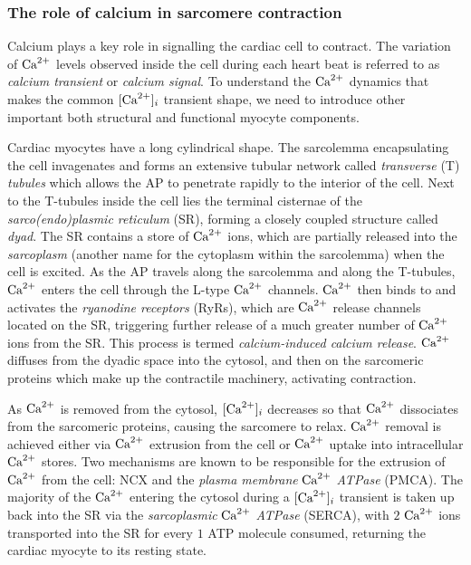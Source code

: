

%
%
%
\subsubsection{The role of calcium in sarcomere contraction}\label{ch1:the_role_of_calcium_in_sarcomere_contraction}
Calcium plays a key role in signalling the cardiac cell to contract. The variation of $\textrm{Ca}^{2+}$ levels observed inside the cell during each heart beat is referred to as \textit{calcium transient} or \textit{calcium signal}. To understand the $\textrm{Ca}^{2+}$ dynamics that makes the common $[\textrm{Ca}^{2+}]_{i}$ transient shape, we need to introduce other important both structural and functional myocyte components.

\vspace{0.2cm}
Cardiac myocytes have a long cylindrical shape. The sarcolemma encapsulating the cell invagenates and forms an extensive tubular network called \textit{transverse} (\acs{T}) \textit{tubules} which allows the AP to penetrate rapidly to the interior of the cell. Next to the T-tubules inside the cell lies the terminal cisternae of the \textit{sarco(endo)plasmic reticulum} (\acs{SR}), forming a closely coupled structure called \textit{dyad}. The SR contains a store of $\textrm{Ca}^{2+}$ ions, which are partially released into the \textit{sarcoplasm} (another name for the cytoplasm within the sarcolemma) when the cell is excited. As the AP travels along the sarcolemma and along the T-tubules, $\textrm{Ca}^{2+}$ enters the cell through the L-type $\textrm{Ca}^{2+}$ channels. $\textrm{Ca}^{2+}$ then binds to and activates the \textit{ryanodine receptors} (\acs{RyR}s), which are $\textrm{Ca}^{2+}$ release channels located on the SR, triggering further release of a much greater number of $\textrm{Ca}^{2+}$ ions from the SR. This process is termed \textit{calcium-induced calcium release}. $\textrm{Ca}^{2+}$ diffuses from the dyadic space into the cytosol, and then on the sarcomeric proteins which make up the contractile machinery, activating contraction.

\vspace{0.2cm}
As $\textrm{Ca}^{2+}$ is removed from the cytosol, $[\textrm{Ca}^{2+}]_{i}$ decreases so that $\textrm{Ca}^{2+}$ dissociates from the sarcomeric proteins, causing the sarcomere to relax. $\textrm{Ca}^{2+}$ removal is achieved either via $\textrm{Ca}^{2+}$ extrusion from the cell or $\textrm{Ca}^{2+}$ uptake into intracellular $\textrm{Ca}^{2+}$ stores. Two mechanisms are known to be responsible for the extrusion of $\textrm{Ca}^{2+}$ from the cell: NCX and the \textit{plasma membrane} $\textrm{Ca}^{2+}$ \textit{ATPase} (\acs{PMCA}). The majority of the $\textrm{Ca}^{2+}$ entering the cytosol during a $[\textrm{Ca}^{2+}]_{i}$ transient is taken up back into the SR via the \textit{sarcoplasmic} $\textrm{Ca}^{2+}$ \textit{ATPase} (\acs{SERCA}), with $2$ $\textrm{Ca}^{2+}$ ions transported into the SR for every $1$ ATP molecule consumed, returning the cardiac myocyte to its resting state.


